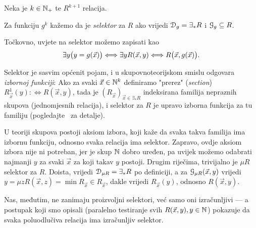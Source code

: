 \begin{definicija}[{name=[selektor]}]
Neka je $k\in{\mathbb N}_+$ te $R^{k+1}$ relacija.

Za funkciju $g^k$ kažemo da je \emph{selektor} za $R$ ako vrijedi $\mathcal D_{g}=\exists_*R$ i $\mathcal G_{g}\subseteq R$.
\end{definicija}

Točkovno, uvjete na selektor možemo zapisati kao
\begin{equation}
    \exists y\bigl(y=g(\vec x)\bigr)\Longleftrightarrow\exists yR(\vec x,y)\Longleftrightarrow R\bigl(\vec x,g(\vec x)\bigr)\text.
\end{equation}

Selektor je sasvim općenit pojam, i u skupovnoteorijskom smislu odgovara \emph{izbornoj funkciji}: Ako za svaki $\vec x\in{\mathbb N}^k$ definiramo "prerez" (\emph{section}) $R_{\vec x}^1(y):\Longleftrightarrow R(\vec x,y)$,
tada je $(R_{\vec x})_{\vec x\in\exists_*R}$ indeksirana familija nepraznih skupova (jednomjesnih relacija), i selektor za $R$ je upravo izborna funkcija za tu familiju (pogledajte~\cite[str.\ 92]{skr:VukTS} za detalje).

U teoriji skupova postoji aksiom izbora, koji kaže da svaka takva familija ima izbornu funkciju, odnosno svaka relacija ima selektor. Zapravo, ovdje aksiom izbora nije ni potreban, jer je skup ${\mathbb N}$ dobro uređen, pa uvijek možemo odabrati najmanji $y$ za svaki $\vec x$ za koji takav $y$ postoji. Drugim riječima, trivijalno je $\mu R$ selektor za $R$. Doista, vrijedi $\mathcal D_{\mu R}=\exists_*R$ po definiciji, a za $\mathcal G_{\mu R}(\vec x,y)$ vrijedi $y=\mu z R(\vec x,z)=\min R_{\vec x}\in R_{\vec x}$, dakle vrijedi $R_{\vec x}(y)$, odnosno $R(\vec x,y)$.

Nas, međutim, ne zanimaju proizvoljni selektori, već samo oni izračunljivi --- a postupak koji smo opisali (paralelno testiranje svih $R(\vec x,y),y\in{\mathbb N}$) pokazuje da svaka poluodlučiva relacija ima izračunljiv selektor.

